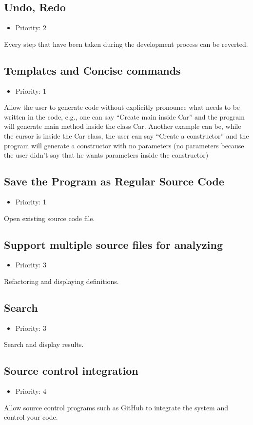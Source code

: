 \subsection{Undo, Redo}
\begin{itemize}
	\item Priority: 2
\end{itemize}
Every step that have been taken during the development process can be reverted.
\subsection{Templates and Concise commands}
\begin{itemize}
	\item Priority: 1
\end{itemize}
Allow the user to generate code without explicitly pronounce what needs to be written in the code, e.g., one can say  “Create main inside Car” and the program will generate main method inside the class Car. Another example can be, while the cursor is inside the Car class, the user can say “Create a constructor” and the program will generate a constructor with no parameters (no parameters because the user didn’t say that he wants parameters inside the constructor)
\subsection{Save the Program as Regular Source Code}
\begin{itemize}
	\item Priority: 1
\end{itemize}
Open existing source code file.
\subsection{Support multiple source files for analyzing}
\begin{itemize}
	\item Priority: 3
\end{itemize}
Refactoring and displaying definitions.
\subsection{Search}
\begin{itemize}
	\item Priority: 3
\end{itemize}
Search and display results.
\subsection{Source control integration}
\begin{itemize}
	\item Priority: 4
\end{itemize}
Allow source control programs such as GitHub to integrate the system and control your code.
